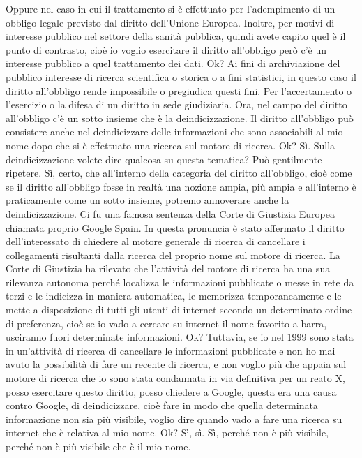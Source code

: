 Oppure nel caso in cui il trattamento si è effettuato per l'adempimento di un obbligo legale previsto dal diritto dell'Unione Europea.
Inoltre, per motivi di interesse pubblico nel settore della sanità pubblica, quindi avete capito quel è il punto di contrasto, cioè io voglio esercitare il diritto all'obbligo però c'è un interesse pubblico a quel trattamento dei dati.
Ok?
Ai fini di archiviazione del pubblico interesse di ricerca scientifica o storica o a fini statistici, in questo caso il diritto all'obbligo rende impossibile o pregiudica questi fini.
Per l'accertamento o l'esercizio o la difesa di un diritto in sede giudiziaria.
Ora, nel campo del diritto all'obbligo c'è un sotto insieme che è la deindicizzazione.
Il diritto all'obbligo può consistere anche nel deindicizzare delle informazioni che sono associabili al mio nome dopo che si è effettuato una ricerca sul motore di ricerca.
Ok?
Sì.
Sulla deindicizzazione volete dire qualcosa su questa tematica?
Può gentilmente ripetere.
Sì, certo, che all'interno della categoria del diritto all'obbligo, cioè come se il diritto all'obbligo fosse in realtà una nozione ampia, più ampia e all'interno è praticamente come un sotto insieme, potremo annoverare anche la deindicizzazione.
Ci fu una famosa sentenza della Corte di Giustizia Europea chiamata proprio Google Spain.
In questa pronuncia è stato affermato il diritto dell'interessato di chiedere al motore generale di ricerca di cancellare i collegamenti risultanti dalla ricerca del proprio nome sul motore di ricerca.
La Corte di Giustizia ha rilevato che l'attività del motore di ricerca ha una sua rilevanza autonoma perché localizza le informazioni pubblicate o messe in rete da terzi e le indicizza in maniera automatica, le memorizza temporaneamente e le mette a disposizione di tutti gli utenti di internet secondo un determinato ordine di preferenza, cioè se io vado a cercare su internet il nome favorito a barra, usciranno fuori determinate informazioni.
Ok?
Tuttavia, se io nel 1999 sono stata in un'attività di ricerca di cancellare le informazioni pubblicate e non ho mai avuto la possibilità di fare un recente di ricerca, e non voglio più che appaia sul motore di ricerca che io sono stata condannata in via definitiva per un reato X, posso esercitare questo diritto, posso chiedere a Google, questa era una causa contro Google, di deindicizzare, cioè fare in modo che quella determinata informazione non sia più visibile, voglio dire quando vado a fare una ricerca su internet che è relativa al mio nome.
Ok?
Sì, sì.
Sì, perché non è più visibile, perché non è più visibile che è il mio nome.
